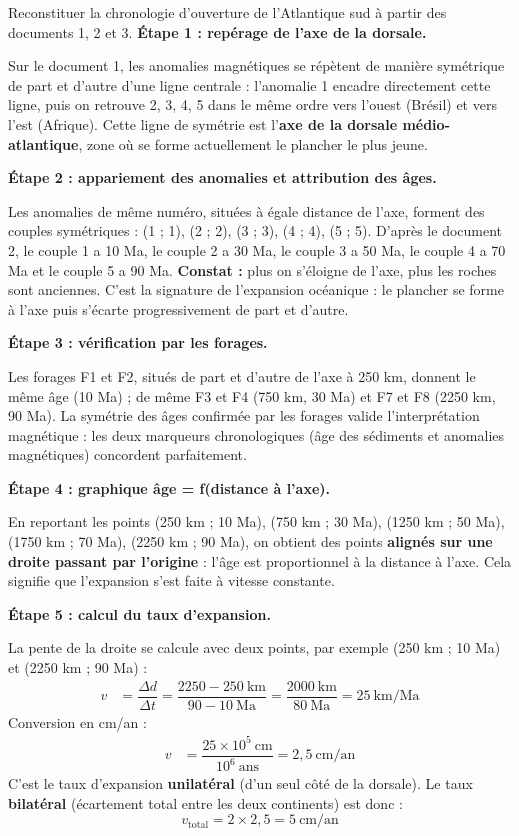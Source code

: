 \documentclass[11pt]{article}
\begin{document}
\begin{exoresolu}
Reconstituer la chronologie d'ouverture de l'Atlantique sud à partir des documents 1, 2 et 3.
\tcblower
\textbf{Étape 1 : repérage de l'axe de la dorsale.}

Sur le document 1, les anomalies magnétiques se répètent de manière symétrique de part et d'autre d'une ligne centrale : l'anomalie 1 encadre directement cette ligne, puis on retrouve 2, 3, 4, 5 dans le même ordre vers l'ouest (Brésil) et vers l'est (Afrique). Cette ligne de symétrie est l'\textbf{axe de la dorsale médio-atlantique}, zone où se forme actuellement le plancher le plus jeune.

\textbf{Étape 2 : appariement des anomalies et attribution des âges.}

Les anomalies de même numéro, situées à égale distance de l'axe, forment des couples symétriques : (1 ; 1), (2 ; 2), (3 ; 3), (4 ; 4), (5 ; 5). D'après le document 2, le couple 1 a 10 Ma, le couple 2 a 30 Ma, le couple 3 a 50 Ma, le couple 4 a 70 Ma et le couple 5 a 90 Ma. \textbf{Constat :} plus on s'éloigne de l'axe, plus les roches sont anciennes. C'est la signature de l'expansion océanique : le plancher se forme à l'axe puis s'écarte progressivement de part et d'autre.

\textbf{Étape 3 : vérification par les forages.}

Les forages F1 et F2, situés de part et d'autre de l'axe à 250 km, donnent le même âge (10 Ma) ; de même F3 et F4 (750 km, 30 Ma) et F7 et F8 (2250 km, 90 Ma). La symétrie des âges confirmée par les forages valide l'interprétation magnétique : les deux marqueurs chronologiques (âge des sédiments et anomalies magnétiques) concordent parfaitement.

\textbf{Étape 4 : graphique âge = f(distance à l'axe).}

En reportant les points (250 km ; 10 Ma), (750 km ; 30 Ma), (1250 km ; 50 Ma), (1750 km ; 70 Ma), (2250 km ; 90 Ma), on obtient des points \textbf{alignés sur une droite passant par l'origine} : l'âge est proportionnel à la distance à l'axe. Cela signifie que l'expansion s'est faite à vitesse constante.

\textbf{Étape 5 : calcul du taux d'expansion.}

La pente de la droite se calcule avec deux points, par exemple (250 km ; 10 Ma) et (2250 km ; 90 Ma) :
\begin{align*}
v &= \dfrac{\Delta d}{\Delta t} = \dfrac{2250 - 250~\text{km}}{90 - 10~\text{Ma}} = \dfrac{2000~\text{km}}{80~\text{Ma}} = 25~\text{km/Ma}
\end{align*}
Conversion en cm/an :
\begin{align*}
v &= \dfrac{25 \times 10^{5}~\text{cm}}{10^{6}~\text{ans}} = 2{,}5~\text{cm/an}
\end{align*}
C'est le taux d'expansion \textbf{unilatéral} (d'un seul côté de la dorsale). Le taux \textbf{bilatéral} (écartement total entre les deux continents) est donc :
\[ v_{\text{total}} = 2 \times 2{,}5 = 5~\text{cm/an} \]


\end{exoresolu}
\end{document}
